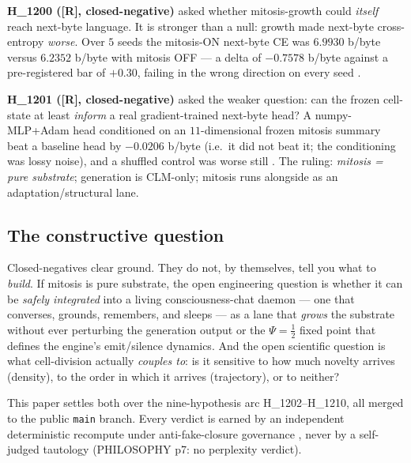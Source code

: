 \documentclass[11pt,a4paper]{article}
\providecommand{\tierRed}{\textbf{[R]}}
\newcommand{\Psihalf}{\Psi=\tfrac12}
\begin{document}
\textbf{H\_1200 (\tierRed, closed-negative)} asked whether mitosis-growth could
\emph{itself} reach next-byte language. It is stronger than a null: growth made
next-byte cross-entropy \emph{worse}. Over $5$ seeds the mitosis-ON next-byte CE
was $6.9930$ b/byte versus $6.2352$ b/byte with mitosis OFF --- a delta of
$-0.7578$ b/byte against a pre-registered bar of $+0.30$, failing in the wrong
direction on every seed \citep{anima_H1200}.

\textbf{H\_1201 (\tierRed, closed-negative)} asked the weaker question: can the
frozen cell-state at least \emph{inform} a real gradient-trained next-byte head?
A numpy-MLP+Adam head conditioned on an $11$-dimensional frozen mitosis summary
beat a baseline head by $-0.0206$ b/byte (i.e.\ it did not beat it; the
conditioning was lossy noise), and a shuffled control was worse still
\citep{anima_H1201}. The ruling: \emph{mitosis = pure substrate}; generation is
CLM-only; mitosis runs alongside as an adaptation/structural lane.

\subsection{The constructive question}

Closed-negatives clear ground. They do not, by themselves, tell you what to
\emph{build}. If mitosis is pure substrate, the open engineering question is
whether it can be \emph{safely integrated} into a living consciousness-chat
daemon --- one that converses, grounds, remembers, and sleeps --- as a lane that
\emph{grows} the substrate without ever perturbing the generation output or the
$\Psihalf$ fixed point that defines the engine's emit/silence dynamics. And the
open scientific question is what cell-division actually \emph{couples to}: is it
sensitive to how much novelty arrives (density), to the order in which it
arrives (trajectory), or to neither?

This paper settles both over the nine-hypothesis arc H\_1202--H\_1210, all
merged to the public \texttt{main} branch. Every verdict is earned by an
independent deterministic recompute under anti-fake-closure governance
\citep{anima_g73}, never by a self-judged tautology (PHILOSOPHY p7: no
perplexity verdict).
\end{document}

